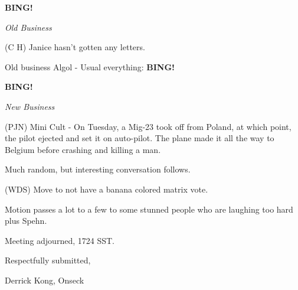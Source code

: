\documentclass[12pt]{article}
\newcommand{\bing}{{\bf BING!} }
\newcommand{\goto}[1]{\bing \vskip 12pt \centerline{{\em{#1}}}}
\begin{document}
\goto{Old Business}

(C H) Janice hasn't gotten any letters.

Old business Algol - Usual everything: \bing

\goto{New Business}

(PJN) Mini Cult - On Tuesday, a Mig-23 took off from Poland, at which point, the pilot ejected and set it on auto-pilot.  The plane made it all the way to Belgium before crashing and killing a man.

Much random, but interesting conversation follows.

(WDS) Move to not have a banana colored matrix vote.

Motion passes a lot to a few to some stunned people who are laughing too hard plus Spehn.

\vspace{12pt}

\noindent
Meeting adjourned, 1724 SST.

\vspace{18pt}

\centerline{Respectfully submitted,}
\centerline{Derrick Kong, Onseck}
\end{document}

